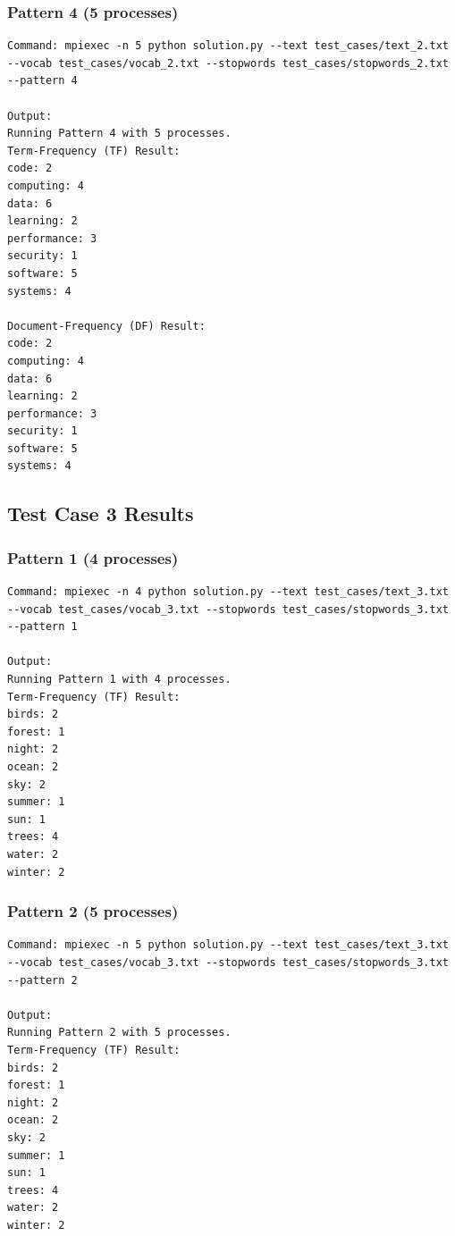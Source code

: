 \documentclass[12pt,a4paper]{article}
\begin{document}
\subsubsection{Pattern 4 (5 processes)}
\begin{lstlisting}
Command: mpiexec -n 5 python solution.py --text test_cases/text_2.txt --vocab test_cases/vocab_2.txt --stopwords test_cases/stopwords_2.txt --pattern 4

Output:
Running Pattern 4 with 5 processes.
Term-Frequency (TF) Result:
code: 2
computing: 4
data: 6
learning: 2
performance: 3
security: 1
software: 5
systems: 4

Document-Frequency (DF) Result:
code: 2
computing: 4
data: 6
learning: 2
performance: 3
security: 1
software: 5
systems: 4
\end{lstlisting}

\subsection{Test Case 3 Results}

\subsubsection{Pattern 1 (4 processes)}
\begin{lstlisting}
Command: mpiexec -n 4 python solution.py --text test_cases/text_3.txt --vocab test_cases/vocab_3.txt --stopwords test_cases/stopwords_3.txt --pattern 1

Output:
Running Pattern 1 with 4 processes.
Term-Frequency (TF) Result:
birds: 2
forest: 1
night: 2
ocean: 2
sky: 2
summer: 1
sun: 1
trees: 4
water: 2
winter: 2
\end{lstlisting}

\subsubsection{Pattern 2 (5 processes)}
\begin{lstlisting}
Command: mpiexec -n 5 python solution.py --text test_cases/text_3.txt --vocab test_cases/vocab_3.txt --stopwords test_cases/stopwords_3.txt --pattern 2

Output:
Running Pattern 2 with 5 processes.
Term-Frequency (TF) Result:
birds: 2
forest: 1
night: 2
ocean: 2
sky: 2
summer: 1
sun: 1
trees: 4
water: 2
winter: 2
\end{lstlisting}
\end{document}
